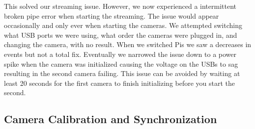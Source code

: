 \documentclass[10pt]{article}
\begin{document}
This solved our streaming issue. However, we now experienced a intermittent broken pipe error when starting the streaming. The issue would appear occasionally and only ever when starting the cameras. We attempted switching what USB ports we were using, what order the cameras were plugged in, and changing the camera, with no result. When we switched Pis we saw a decreases in events but not a total fix. Eventually we narrowed the issue down to a power spike when the camera was initialized causing the voltage on the USBs to sag resulting in the second camera failing. This issue can be avoided by waiting at least 20 seconds for the first camera to finish initializing before you start the second. 
\subsection{Camera Calibration and Synchronization}
\end{document}
